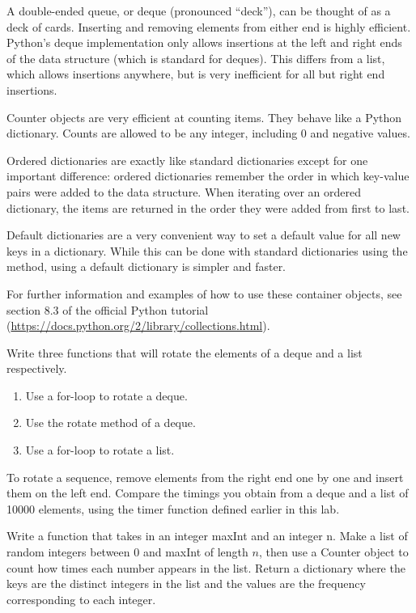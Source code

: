 A double-ended queue, or deque (pronounced ``deck''), can be thought of as a deck of cards.
Inserting and removing elements from either end is highly efficient.
Python's deque implementation only allows insertions at the left and right ends of the data structure (which is standard for deques).
This differs from a list, which allows insertions anywhere, but is very inefficient for all but right end insertions.

Counter objects are very efficient at counting items.  They behave like a Python dictionary.  Counts are allowed to be any integer, including 0 and negative values.

Ordered dictionaries are exactly like standard dictionaries except for one important difference:
ordered dictionaries remember the order in which key-value pairs were added to the data structure.
When iterating over an ordered dictionary, the items are returned in the order they were added from first to last.

Default dictionaries are a very convenient way to set a default value for all new keys in a dictionary.
While this can be done with standard dictionaries using the  method, using a default dictionary is simpler and faster.

For further information and examples of how to use these container objects, see section 8.3 of the official Python tutorial (\url{https://docs.python.org/2/library/collections.html}).

\begin{problem}
Write three functions that will rotate the elements of a deque and a list respectively.
\begin{enumerate}
\item Use a for-loop to rotate a deque.
\item Use the rotate method of a deque.
\item Use a for-loop to rotate a list.
\end{enumerate}

To rotate a sequence, remove elements from the right end one by one and insert them on the left end.
Compare the timings you obtain from a deque and a list of 10000 elements, using the timer function defined earlier in this lab.
\end{problem}

\begin{problem}
Write a function that takes in an integer maxInt and an integer n.
Make a list of random integers between 0 and maxInt of length $n$, then use a Counter object to count how times each number appears in the list.
Return a dictionary where the keys are the distinct integers in the list and the values are the frequency corresponding to each integer.
\end{problem}

